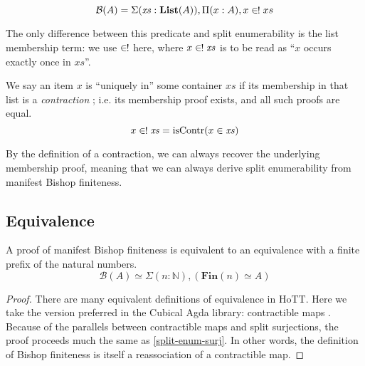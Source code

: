 \begin{rm-definition}
  \begin{equation}
    \mathcal{B}(A) = \Sigma {(\mathit{xs} : \textbf{List}(A))} , \Pi {(x : A)} , x \inunique xs
  \end{equation}
\end{rm-definition}
The only difference between this predicate and split enumerability is the list
membership term: we use \(\inunique\) here, where \(x \inunique \mathit{xs}\) is
to be read as ``\(x\) occurs exactly once in \(\mathit{xs}\)''.
\begin{rm-definition}
  We say an item \(x\) is ``uniquely in'' some container \(\mathit{xs}\) if its
  membership in that list is a \emph{contraction} \cite[definition
  3.11.1]{hottbook}; i.e. its membership proof exists, and all such proofs are
  equal.
  \begin{equation}
    x \inunique \mathit{xs} = \text{isContr}(x \in \mathit{xs})
  \end{equation}
\end{rm-definition}
By the definition of a contraction, we can always recover the underlying
membership proof, meaning that we can always derive split enumerability from
manifest Bishop finiteness.
\subsection{Equivalence}
\begin{rm-lemma} \label{bishop-equiv}
  A proof of manifest Bishop finiteness is equivalent to an equivalence with a
  finite prefix of the natural numbers.
  \begin{equation}
    \mathcal{B}(A) \simeq \Sigma {(n : \mathbb{N})} , \left( \mathbf{Fin}(n) \simeq A \right)
  \end{equation}
\end{rm-lemma}
\begin{proof}
  There are many equivalent definitions of equivalence in HoTT.
  Here we take the version preferred in the Cubical Agda library: contractible
  maps \cite[definition 4.4.1]{hottbook}.
  Because of the parallels between contractible maps and split surjections,
  the proof proceeds much the same as \ref{split-enum-surj}.
  In other words, the definition of Bishop finiteness is itself a reassociation
  of a contractible map.
\end{proof}
